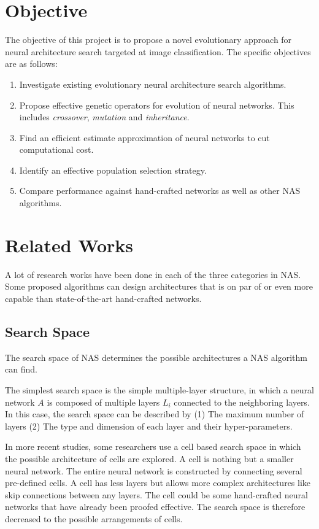 \documentclass{article}
\begin{document}
\begin{normalsize}
   
    \section{Objective}

    The objective of this project is to propose a novel evolutionary approach for neural architecture search targeted at image classification. The specific objectives are as follows:
    \begin{enumerate}
      \item Investigate existing evolutionary neural architecture search algorithms.
      \item Propose effective genetic operators for evolution of neural networks. This includes \emph{crossover}, \emph{mutation} and \emph{inheritance}.
      \item Find an efficient estimate approximation of neural networks to cut computational cost.
      \item Identify an effective population selection strategy.
      \item Compare performance against hand-crafted networks as well as other NAS algorithms.
    \end{enumerate}

    \section{Related Works}
    A lot of research works have been done in each of the three categories in NAS. Some proposed algorithms can design architectures that is on par of or even more capable than state-of-the-art hand-crafted networks.
    
    \subsection{Search Space}
    
    The search space of NAS determines the possible architectures a NAS algorithm can find.

    The simplest search space is the simple multiple-layer structure, in which a neural network $A$ is composed of multiple layers $L_i$ connected to the neighboring layers. In this case, the search space can be described by (1) The maximum number of layers (2) The type and dimension of each layer and their hyper-parameters\cite{chollet2017xception}\cite{baker2016designing}. 

    In more recent studies, some researchers use a cell based search space in which the possible architecture of cells are explored. A cell is nothing but a smaller neural network. The entire neural network is constructed by connecting several pre-defined cells. A cell has less layers but allows more complex architectures like skip connections between any layers\cite{cai2018path}\cite{real2018regularized}. The cell could be some hand-crafted neural networks that have already been proofed effective. The search space is therefore decreased to the possible arrangements of cells.


\end{normalsize}
\end{document}

